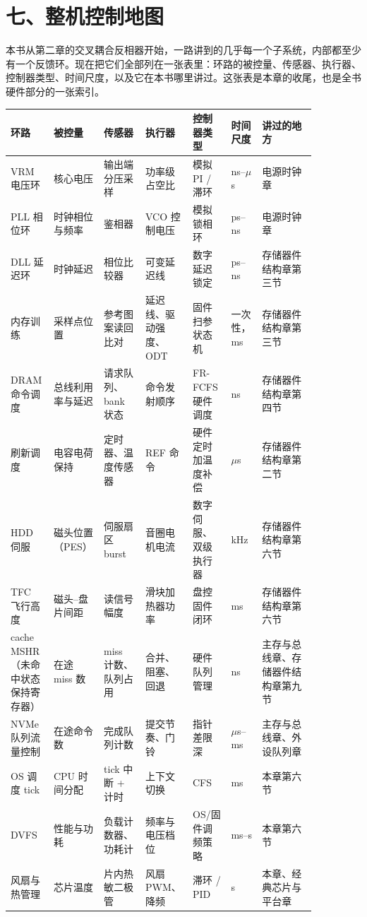 \section{七、整机控制地图}

本书从第二章的交叉耦合反相器开始，一路讲到的几乎每一个子系统，内部都至少有一个反馈环。现在把它们全部列在一张表里：环路的被控量、传感器、执行器、控制器类型、时间尺度，以及它在本书哪里讲过。这张表是本章的收尾，也是全书硬件部分的一张索引。

\begin{longtable}{L{0.13\linewidth}L{0.11\linewidth}L{0.13\linewidth}L{0.11\linewidth}L{0.12\linewidth}L{0.09\linewidth}L{0.17\linewidth}}
\toprule
环路 & 被控量 & 传感器 & 执行器 & 控制器类型 & 时间尺度 & 讲过的地方 \\
\midrule
VRM 电压环 & 核心电压 & 输出端分压采样 & 功率级占空比 & 模拟 PI / 滞环 & ns--$\mu$s & 电源时钟章 \\
PLL 相位环 & 时钟相位与频率 & 鉴相器 & VCO 控制电压 & 模拟锁相环 & ps--ns & 电源时钟章 \\
DLL 延迟环 & 时钟延迟 & 相位比较器 & 可变延迟线 & 数字延迟锁定 & ps--ns & 存储器件结构章第三节 \\
内存训练 & 采样点位置 & 参考图案读回比对 & 延迟线、驱动强度、ODT & 固件扫参状态机 & 一次性，ms & 存储器件结构章第三节 \\
DRAM 命令调度 & 总线利用率与延迟 & 请求队列、bank 状态 & 命令发射顺序 & FR-FCFS 硬件调度 & ns & 存储器件结构章第四节 \\
刷新调度 & 电容电荷保持 & 定时器、温度传感器 & REF 命令 & 硬件定时加温度补偿 & $\mu$s & 存储器件结构章第二节 \\
HDD 伺服 & 磁头位置（PES） & 伺服扇区 burst & 音圈电机电流 & 数字伺服、双级执行器 & kHz & 存储器件结构章第六节 \\
TFC 飞行高度 & 磁头--盘片间距 & 读信号幅度 & 滑块加热器功率 & 盘控固件闭环 & ms & 存储器件结构章第六节 \\
cache MSHR（未命中状态保持寄存器） & 在途 miss 数 & miss 计数、队列占用 & 合并、阻塞、回退 & 硬件队列管理 & ns & 主存与总线章、存储器件结构章第九节 \\
NVMe 队列流量控制 & 在途命令数 & 完成队列计数 & 提交节奏、门铃 & 指针差限深 & $\mu$s--ms & 主存与总线章、外设队列章 \\
OS 调度 tick & CPU 时间分配 & tick 中断 + 计时 & 上下文切换 & CFS & ms & 本章第六节 \\
DVFS & 性能与功耗 & 负载计数器、功耗计 & 频率与电压档位 & OS/固件调频策略 & ms--s & 本章第六节 \\
风扇与热管理 & 芯片温度 & 片内热敏二极管 & 风扇 PWM、降频 & 滞环 / PID & s & 本章、经典芯片与平台章 \\
\bottomrule
\end{longtable}

